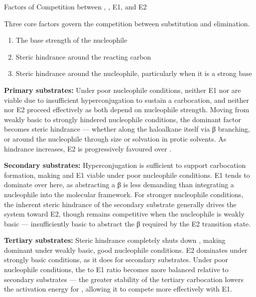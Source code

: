 \documentclass[10pt]{article}
\begin{document}
  \begin{core}{Factors of Competition between \snt, \sno, E1, and E2}

    Three core factors govern the competition between substitution and elimination.

    \begin{enumerate}

      \item The base strength of the nucleophile

      \item Steric hindrance around the reacting carbon

      \item Steric hindrance around the nucleophile, particularly when it is a strong base
        
    \end{enumerate}

    \textbf{Primary substrates:} Under poor nucleophile conditions, neither E1 nor \sno are viable due to insufficient hyperconjugation to sustain a carbocation, and neither \snt nor E2 proceed effectively as both depend on nucleophile strength. Moving from weakly basic to strongly hindered nucleophile conditions, the dominant factor becomes steric hindrance --- whether along the haloalkane itself via β branching, or around the nucleophile through size or solvation in protic solvents. As hindrance increases, E2 is progressively favoured over \snt.

    \textbf{Secondary substrates:} Hyperconjugation is sufficient to support carbocation formation, making \sno and E1 viable under poor nucleophile conditions. E1 tends to dominate over \sno here, as abstracting a β  is less demanding than integrating a nucleophile into the molecular framework. For stronger nucleophile conditions, the inherent steric hindrance of the secondary substrate generally drives the system toward E2, though \snt remains competitive when the nucleophile is weakly basic --- insufficiently basic to abstract the β  required by the E2 transition state.

    \textbf{Tertiary substrates:} Steric hindrance completely shuts down \snt, making \sno dominant under weakly basic, good nucleophile conditions. E2 dominates under strongly basic conditions, as it does for secondary substrates. Under poor nucleophile conditions, the \sno to E1 ratio becomes more balanced relative to secondary substrates --- the greater stability of the tertiary carbocation lowers the activation energy for \sno, allowing it to compete more effectively with E1.


\end{core}
\end{document}
